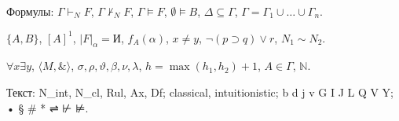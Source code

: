 
\shapka
Формулы: $\Gamma\vdash_N F$, $\Gamma\nvdash_N F$, $\Gamma\models F$, $\emptyset\models B$, $\Delta\subseteq\Gamma$, $\Gamma=\Gamma_1\cup\dots\cup\Gamma_n$.\par
$\{A,B\}$, $[A]^1$, $|F|_\alpha=\text{И}$, $f_A(\alpha)$, $x\neq y$, $\neg(p\supset q)\vee r$, $N_1\sim N_2$.\par
$\forall x\exists y$, $\langle M,\&\rangle$, $\sigma,\rho,\vartheta,\beta,\nu,\lambda$, $h=\max(h_1,h_2)+1$, $A\in\Gamma$, $\mathbb{N}$.\par
Текст: N\_int, N\_cl, Rul, Ax, Df; classical, intuitionistic; b d j v G I J L Q V Y; • § \# * ⇌ ⊬ ⊭.\par

